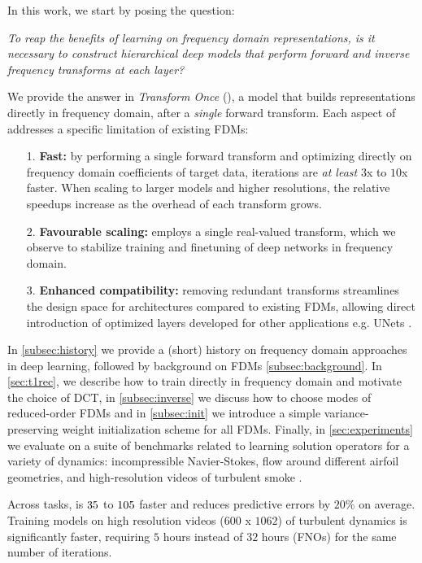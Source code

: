 In this work, we start by posing the question: 

{\centering
\textit{To reap the benefits of learning on frequency domain representations, is it necessary to construct hierarchical deep models that perform forward and inverse frequency transforms at each layer?}
}

We provide the answer in \textit{Transform Once} (\ourmethod{}), a model that builds representations directly in frequency domain, after a \textit{single} forward transform. Each aspect of \ourmethod{} addresses a specific limitation of existing FDMs:
\begin{itemize}[leftmargin=1cm]
    \item[1.] \textbf{Fast:} by performing a single forward transform and optimizing directly on frequency domain coefficients of target data, \ourmethod{} iterations are \textit{at least} $3$x to $10$x faster. When scaling to larger models and higher resolutions, the relative speedups increase as the overhead of each transform grows.
    \item[2.] \textbf{Favourable scaling:} \ourmethod{} employs a single real-valued transform, which we observe to stabilize training and finetuning of deep networks in frequency domain.
    \item[3.] \textbf{Enhanced compatibility:} removing redundant transforms streamlines the design space for \ourmethod{} architectures compared to existing FDMs, allowing direct introduction of optimized layers developed for other applications e.g. UNets \citep{ronneberger2015u}.
\end{itemize}


In \cref{subsec:history} we provide a (short) history on frequency domain approaches in deep learning, followed by background on FDMs \cref{subsec:background}. In \cref{sec:t1rec}, we describe how to train \ourmethod{} directly in frequency domain and motivate the choice of DCT, in \cref{subsec:inverse} we discuss how to choose modes of reduced-order FDMs and in \cref{subsec:init} we introduce a simple variance-preserving weight initialization scheme for all FDMs. Finally, in \cref{sec:experiments} we evaluate \ourmethod{} on a suite of benchmarks related to learning solution operators for a variety of dynamics: incompressible Navier-Stokes, flow around different airfoil geometries, and high-resolution videos of turbulent smoke \citep{eckert2019scalarflow}.

Across tasks, \ourmethod{} is $35$ to $105$ faster and reduces predictive errors by $20\%$ on average. Training \ourmethod{} models on high resolution videos ($600$ x $1062$) of turbulent dynamics is significantly faster, requiring $5$ hours instead of $32$ hours (FNOs) for the same number of iterations.

